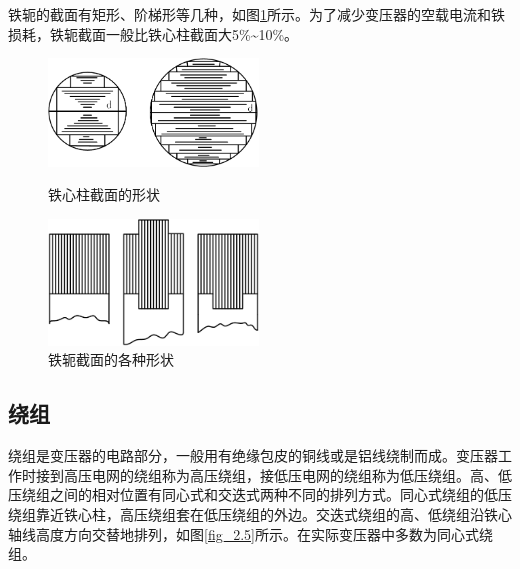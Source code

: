 \documentclass{book}
\begin{document}
铁轭的截面有矩形、阶梯形等几种，如图\ref{fig:2.4}所示。为了减少变压器的空载电流和铁损耗，铁轭截面一般比铁心柱截面大5\%\textasciitilde10\%。
\begin{figure}  %
	\begin{minipage}[H]{0.5\linewidth}  
		\centering  
		\includegraphics[width=2.2in]{2-3.png}  
		\caption{铁心柱截面的形状}  
		\label{fig:2.3}  
	\end{minipage}
	\begin{minipage}[H]{0.5\linewidth}  
		\centering  
		\includegraphics[width=2.2in]{2-4.png}  
		\caption{铁轭截面的各种形状}  
		\label{fig:2.4}  
	\end{minipage} 
\end{figure} 
\subsection{绕组}
绕组是变压器的电路部分，一般用有绝缘包皮的铜线或是铝线绕制而成。变压器工作时接到高压电网的绕组称为高压绕组，接低压电网的绕组称为低压绕组。高、低压绕组之间的相对位置有同心式和交迭式两种不同的排列方式。同心式绕组的低压绕组靠近铁心柱，高压绕组套在低压绕组的外边。交迭式绕组的高、低绕组沿铁心轴线高度方向交替地排列，如图\ref{fig_2.5}所示。在实际变压器中多数为同心式绕组。
\end{document}
